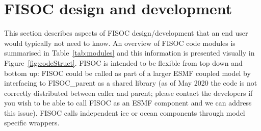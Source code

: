 \documentclass[11pt]{article}
\begin{document}









\section{FISOC design and development}
\label{sec:FISOC_SDG}

This section describes aspects of FISOC design/development that an end user
would typically not need to know.
An overview of FISOC code modules is summarised
in Table~\ref{tab:modules} and this information is presented visually 
in Figure~\ref{fig:codeStruct}.
FISOC is intended to be flexible from top down and bottom up:
FISOC could be called as part of a larger ESMF coupled model by interfacing to FISOC\_parent
as a shared library (as of May 2020 the code is not correctly distributed between caller and parent;
please contact the developers if you wish to be able to call FISOC as an ESMF component and we
can address this issue).
FISOC calls independent ice or ocean components through model specific wrappers. 
\end{document}
